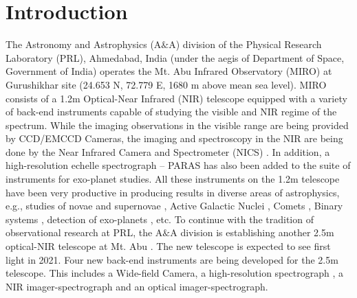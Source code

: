 \section{Introduction}
\label{sec-Intro}
The Astronomy and Astrophysics (A$\&$A) division of the Physical Research Laboratory (PRL), Ahmedabad, India (under the aegis of Department of Space, Government of India) operates the Mt. Abu Infrared Observatory (MIRO) at Gurushikhar site (24.653 N, 72.779 E, 1680 m above mean sea level). MIRO consists of a 1.2m Optical-Near Infrared (NIR) telescope equipped with a variety of back-end instruments capable of studying the visible and NIR regime of the spectrum. While the imaging observations in the visible range are being provided by  CCD/EMCCD Cameras, the imaging and spectroscopy in the NIR are being done by the Near Infrared Camera and Spectrometer (NICS) \citep{Anandarao2008}. In addition, a high-resolution echelle spectrograph – PARAS \citep{Chakraborty2014} has also been added to the suite of instruments for exo-planet studies. All these instruments on the 1.2m telescope have been very productive in producing results in diverse areas of astrophysics, e.g., studies of novae and supernovae \citep{Srivastava2016, Joshi2017, Banerjee2018}, Active Galactic Nuclei \citep{Kaur2017}, Comets \citep{Venkataramani2019}, Binary systems \citep{Chaturvedi2016}, detection of exo-planets \citep{Chakraborty2018}, etc. To continue with the tradition of observational research at PRL, the A$\&$A division is establishing another 2.5m optical-NIR telescope at Mt. Abu \citep{Pirnay2018}. The new telescope is expected to see first light in 2021. Four new back-end instruments are being developed for the  2.5m telescope. This includes a Wide-field Camera, a high-resolution spectrograph \citep{Chakraborty2018b}, a NIR imager-spectrograph and an optical imager-spectrograph.
\par
